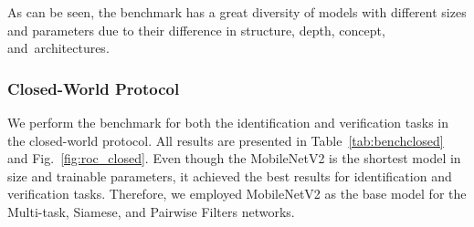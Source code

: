 \begin{table}[!ht]
\centering
\caption{Size~(MB) and number of trainable parameters of the \gls*{cnn}~models used in the benchmark.}
\label{tab:modelstats}

\vspace{-2mm}
\end{table}

As can be seen, the benchmark has a great diversity of models with different sizes and parameters due to their difference in structure, depth, concept, and~architectures. 

\subsubsection{Closed-World Protocol}
\label{sec:closed}
We perform the benchmark for both the identification and verification tasks in the closed-world protocol.
All results are presented in Table~\ref{tab:benchclosed} and Fig.~\ref{fig:roc_closed}.
Even though the MobileNetV2 is the shortest model in size and trainable parameters, it achieved the best results for identification and verification tasks.
Therefore, we employed MobileNetV2 as the base model for the Multi-task, Siamese, and Pairwise Filters networks.

